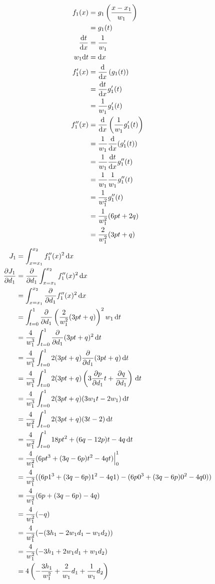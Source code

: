 \documentclass{article}
\begin{document}
\begin{align*}
  f_1(x)
  &= g_1\left(\frac{x-x_1}{w_1}\right) \\
  &= g_1(t) \\
  \frac{\mathrm{d}t}{\mathrm{d}x}
  &= \frac{1}{w_1} \\
  w_1\mathrm{d}t
  &= \mathrm{d}x \\
  f_1'(x)
  &= \frac{\mathrm{d}}{\mathrm{d}x} \left(g_1(t)\right) \\
  &= \frac{\mathrm{d}t}{\mathrm{d}x} g_1'(t) \\
  &= \frac{1}{w_1}g_1'(t) \\
  f_1''(x)
  &= \frac{\mathrm{d}}{\mathrm{d}x} \left(\frac{1}{w_1}g_1'(t)\right) \\
  &= \frac{1}{w_1} \frac{\mathrm{d}}{\mathrm{d}x} (g_1'(t)) \\
  &= \frac{1}{w_1} \frac{\mathrm{d}t}{\mathrm{d}x} g_1''(t) \\
  &= \frac{1}{w_1} \frac{1}{w_1} g_1''(t) \\
  &= \frac{1}{w_1^2} g_1''(t) \\
  &= \frac{1}{w_1^2}(6pt+2q) \\
  &= \frac{2}{w_1^2}(3pt+q)
\end{align*}
\begin{align*}
  J_1
  &= \int_{x=x_1}^{x_2}f_1''(x)^2\, \mathrm{d}x \\
  \frac{\partial J_1}{\partial d_1}
  &= \frac{\partial}{\partial d_1} \int_{x=x_1}^{x_2} f_1''(x)^2 \, \mathrm{d}x \\
  &= \int_{x=x_1}^{x_2} \frac{\partial}{\partial d_1} f_1''(x)^2 \, \mathrm{d}x \\
  &= \int_{t=0}^{1} \frac{\partial}{\partial d_1} \left(\frac{2}{w_1^2}(3pt+q)\right)^2 w_1 \, \mathrm{d}t \\
  &= \frac{4}{w_1^3} \int_{t=0}^{1} \frac{\partial}{\partial d_1} (3pt+q)^2 \, \mathrm{d}t \\
  &= \frac{4}{w_1^3} \int_{t=0}^{1} 2(3pt+q) \frac{\partial}{\partial d_1} (3pt+q) \, \mathrm{d}t \\
  &= \frac{4}{w_1^3} \int_{t=0}^{1} 2(3pt+q) \left(3\frac{\partial p}{\partial d_1}t+\frac{\partial q}{\partial d_1}\right) \, \mathrm{d}t \\
  &= \frac{4}{w_1^3} \int_{t=0}^{1} 2(3pt+q)(3w_1t-2w_1) \, \mathrm{d}t \\
  &= \frac{4}{w_1^2} \int_{t=0}^{1} 2(3pt+q)(3t-2) \, \mathrm{d}t \\
  &= \frac{4}{w_1^2} \int_{t=0}^{1} 18pt^2+(6q-12p)t-4q \, \mathrm{d}t \\
  &= \frac{4}{w_1^2} (6pt^3+(3q-6p)t^2-4qt)\Bigr|_0^1 \\
  &= \frac{4}{w_1^2} ((6p1^3+(3q-6p)1^2-4q1)-(6p0^3+(3q-6p)0^2-4q0)) \\
  &= \frac{4}{w_1^2} (6p+(3q-6p)-4q) \\
  &= \frac{4}{w_1^2} (-q) \\
  &= \frac{4}{w_1^2} (-(3h_1-2w_1d_1-w_1d_2)) \\
  &= \frac{4}{w_1^2} (-3h_1+2w_1d_1+w_1d_2) \\
  &= 4\left(-\frac{3h_1}{w_1^2}+\frac{2}{w_1}d_1+\frac{1}{w_1}d_2\right)
\end{align*}
\end{document}

